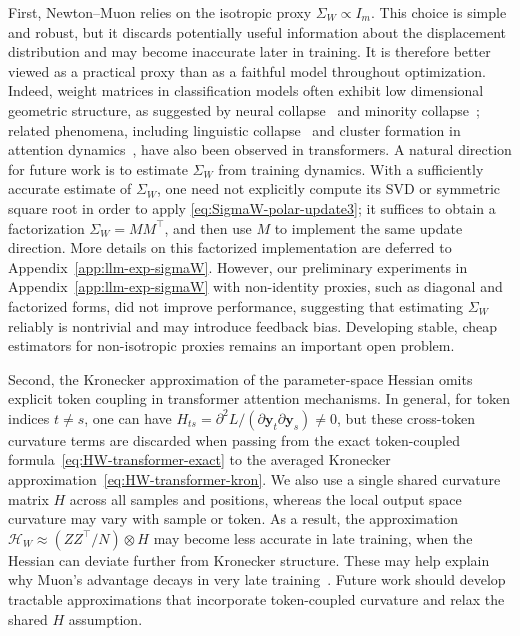 \documentclass[11pt]{article}
\begin{document}
First, Newton--Muon relies on the isotropic proxy ${\Sigma}_W \propto {I}_m$. This choice is simple and robust, but it discards potentially useful information about the displacement distribution and may become inaccurate later in training. It is therefore better viewed as a practical proxy than as a faithful model throughout optimization. Indeed, weight matrices in classification models often exhibit low dimensional geometric structure, as suggested by neural collapse~\citep{papyan2020prevalence} and minority collapse~\citep{fang2021exploring}; related phenomena, including linguistic collapse~\citep{wu2024linguistic} and cluster formation in attention dynamics~\citep{geshkovski2023emergence}, have also been observed in transformers. A natural direction for future work is to estimate ${\Sigma}_{{W}}$ from training dynamics. With a sufficiently accurate estimate of ${\Sigma}_{{W}}$, one need not explicitly compute its SVD or symmetric square root in order to apply \eqref{eq:SigmaW-polar-update3}; it suffices to obtain a factorization ${\Sigma}_{{W}} = {M}{M}^\top$, and then use ${M}$ to implement the same update direction. More details on this factorized implementation are deferred to Appendix~\ref{app:llm-exp-sigmaW}. However, our preliminary experiments in Appendix~\ref{app:llm-exp-sigmaW} with non-identity proxies, such as diagonal and factorized forms, did not improve performance, suggesting that estimating ${\Sigma}_{{W}}$ reliably is nontrivial and may introduce feedback bias. Developing stable, cheap estimators for non-isotropic proxies remains an important open problem.

Second, the Kronecker approximation of the parameter-space Hessian omits explicit token coupling in transformer attention mechanisms. In general, for token indices $t \neq s$, one can have $H_{ts} = \partial^2 L / (\partial \boldsymbol{y}_t \partial \boldsymbol{y}_s) \neq 0$, but these cross-token curvature terms are discarded when passing from the exact token-coupled formula~\eqref{eq:HW-transformer-exact} to the averaged Kronecker approximation~\eqref{eq:HW-transformer-kron}. We also use a single shared curvature matrix $H$ across all samples and positions, whereas the local output space curvature may vary with sample or token. As a result, the approximation $\mathcal{H}_W \approx (ZZ^\top/N)\otimes H$ may become less accurate in late training, when the Hessian can deviate further from Kronecker structure. These may help explain why Muon's advantage decays in very late training~\citep{wen2025fantastic}. Future work should develop tractable approximations that incorporate token-coupled curvature and relax the shared $H$ assumption.
\end{document}
